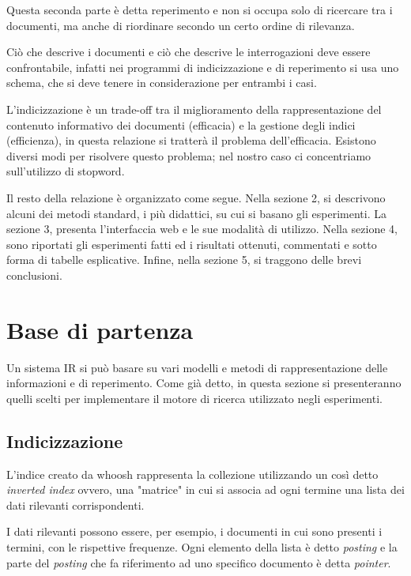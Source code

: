 \documentclass[runningheads]{llncs}
\begin{document}
  Questa seconda parte \`e detta reperimento e non si occupa solo di ricercare tra i documenti, ma anche di riordinare secondo un certo ordine di rilevanza. 
  
  Ci\`o che descrive i documenti e ci\`o che descrive le interrogazioni deve essere confrontabile, infatti nei programmi di indicizzazione e di reperimento si usa uno schema, che si deve tenere in considerazione per entrambi i casi.

  
L'indicizzazione \`e un trade-off tra il  miglioramento della rappresentazione del
contenuto informativo dei documenti (efficacia) e la gestione degli indici (efficienza), in questa relazione si tratter\`a il problema dell'efficacia.
Esistono diversi modi per risolvere questo problema; nel nostro caso 
ci concentriamo sull'utilizzo di stopword.


\vspace{\baselineskip}

Il resto della relazione \`e organizzato come segue. Nella sezione 2, si descrivono
alcuni dei metodi standard, i pi\`u didattici, su cui si basano gli esperimenti.
La sezione 3, presenta l'interfaccia web e le sue modalit\`a di utilizzo.
Nella sezione 4, sono riportati gli esperimenti fatti ed i risultati ottenuti,
commentati e sotto forma di tabelle esplicative. Infine, nella sezione 5,
si traggono delle brevi conclusioni.



\section{Base di partenza}
\label{sec:base-di-partenza}
Un sistema IR si pu\`o basare su vari modelli e metodi di rappresentazione delle informazioni e di reperimento.
Come gi\`a detto, in questa sezione si presenteranno quelli scelti per implementare il motore di ricerca utilizzato negli esperimenti.

\subsection{Indicizzazione}
L'indice creato da whoosh rappresenta la collezione utilizzando un cos\`i detto \emph{inverted index}\cite{WBC_ii} ovvero, una "matrice" in cui si associa ad ogni termine
una lista dei dati rilevanti corrispondenti.

I dati rilevanti possono essere, per esempio, i documenti in cui sono presenti i termini, con le rispettive frequenze.
Ogni elemento della lista \`e detto \emph{posting} e la parte del \emph{posting} che fa riferimento ad uno specifico documento
\`e detta \emph{pointer}.
\end{document}
